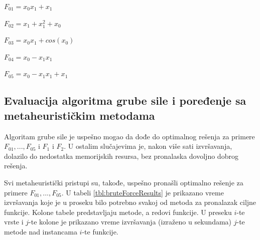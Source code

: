 \documentclass[main.tex]{subfiles}
\begin{document}
$F_{01} = x_0 x_1 + x_1$

$F_{02} = x_1 + x_1^2 + x_0$

$F_{03} = x_0 x_1 + cos(x_0)$

$F_{04} = x_0 - x_1 x_1$

$F_{05} = x_0 - x_1 x_1 + x_1$


\subsection{Evaluacija algoritma grube sile i poređenje sa metaheurističkim metodama}
\label{sec:bruteForceEval}

Algoritam grube sile je uspešno mogao da dođe do optimalnog rešenja za primere $F_{01}, ..., F_{05}$ i $F_{1}$ i $F_{2}$. U ostalim slučajevima je, nakon više sati izvršavanja, dolazilo do nedostatka memorijskih resursa, bez pronalaska dovoljno dobrog rešenja.

Svi metaheuristički pristupi su, takođe, uspešno pronašli optimalno rešenje za primere $F_{01}, ..., F_{05}$. U tabeli \ref{tbl:bruteForceResults} je prikazano vreme izvršavanja koje je u proseku bilo potrebno svakoj od metoda za pronalazak ciljne funkcije. Kolone tabele predstavljaju metode, a redovi funkcije. U preseku $i$-te vrste i $j$-te kolone je prikazano vreme izvršavanja (izraženo u sekundama) $j$-te metode nad instancama $i$-te funkcije.


\iffalse
\end{document}
